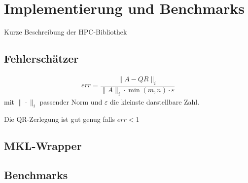 \chapter{Implementierung und Benchmarks}
Kurze Beschreibung der HPC-Bibliothek

\section{Fehlerschätzer}
\begin{align}
	err = \dfrac{\|A - QR\|_i}{\|A\|_i \cdot \min(m,n) \cdot \varepsilon}
\end{align}
mit $\|\cdot\|_i$ passender Norm und $\varepsilon$ die kleinste darstellbare Zahl.

Die QR-Zerlegung ist gut genug falls $ err < 1 $
\section{MKL-Wrapper}

\section{Benchmarks}